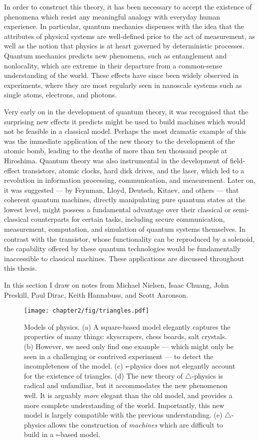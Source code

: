 In order to construct this theory, it has been necessary to accept the existence of phenomena which resist any meaningful analogy with everyday human experience. In particular, quantum mechanics dispenses with the idea that the attributes of physical systems are well-defined prior to the act of measurement, as well as the notion that physics is at heart governed by deterministic processes. Quantum mechanics predicts new phenomena, such as entanglement and nonlocality, which are extreme in their departure from a common-sense understanding of the world.  These effects have since been widely observed in experiments, where they are most regularly seen in nanoscale systems such as single atoms, electrons, and photons.

Very early on in the development of quantum theory, it was recognised that the surprising new effects it predicts might be used to build machines which would not be feasible in a classical model. Perhaps the most dramatic example of this was the immediate application of the new theory to the development of the atomic bomb, leading to the deaths of more than ten thousand people at Hiroshima. Quantum theory was also instrumental in the development of field-effect transistors, atomic clocks, hard disk drives, and the laser, which led to a revolution in information processing, communication, and measurement.
Later on, it was suggested --- by Feynman, Lloyd, Deutsch, Kitaev, and others --- that coherent quantum machines, directly manipulating pure quantum states at the lowest level, might possess a fundamental advantage over their classical or semi-classical counterparts for certain tasks, including secure communication, measurement, computation, and simulation of quantum systems themselves. In contrast with the transistor, whose functionality can be reproduced by a solenoid, the capability offered by these quantum technologies would be fundamentally inaccessible to classical machines.  
These applications are discussed throughout this thesis.

In this section I draw on notes from Michael Nielsen, Isaac Chuang, John Preskill, Paul Dirac, Keith Hannabuss, and Scott Aaronson.

\begin{figure}[t!]
\centering
\texttt{[image: chapter2/fig/triangles.pdf]}
\caption[Models of physics.]{ 
Models of physics. (a) A square-based model elegantly captures the properties of many things:  skyscrapers, chess boards, salt crystals. (b) However, we need only find one example --- which might only be seen in a challenging or contrived experiment --- to detect the incompleteness of the model. (c) $\square$-physics does not elegantly account for the existence of triangles. (d) The new theory of $\bigtriangleup$-physics is radical and unfamiliar, but it accommodates the new phenomenon well. It is arguably \emph{more} elegant than the old model, and provides a more complete understanding of the world.  Importantly, this new model is largely compatible with the previous understanding.  
(e)  $\bigtriangleup$-physics allows the construction of \emph{machines} which are difficult to build in a $\square$-based model.
}
\label{fig:triangles}
\end{figure}

